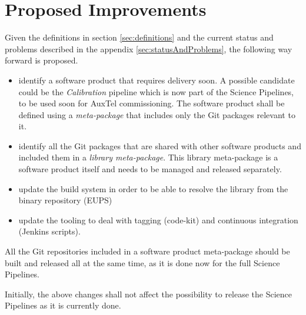 \newpage
\section{Proposed Improvements}\label{sec:proimp}

Given the definitions in section \ref{sec:definitions} and the current status and problems described in the appendix \ref{sec:statusAndProblems}, the following way forward is proposed.

\begin{itemize}
\item identify a software product that requires delivery soon.
A possible candidate could be the \textit{Calibration} pipeline which is now  part of the Science Pipelines, to be used soon for AuxTel commissioning.
The software product shall be defined using a \textit{meta-package} that includes only the Git packages relevant to it.
\item identify all the Git packages that are shared with other software products and included them in a \textit{library meta-package}.
This library meta-package is a software product itself and needs to be managed and released separately.
\item update the build system in order to be able to resolve the library from the binary repository (EUPS)
\item update the tooling to deal with tagging (code-kit) and continuous integration (Jenkins scripts).
\end{itemize}

All the Git repositories included in a software product meta-package should be built and released all at the same time, as it is done now for the full Science Pipelines.

Initially, the above changes shall not affect the possibility to release the Science Pipelines as it is currently done.

